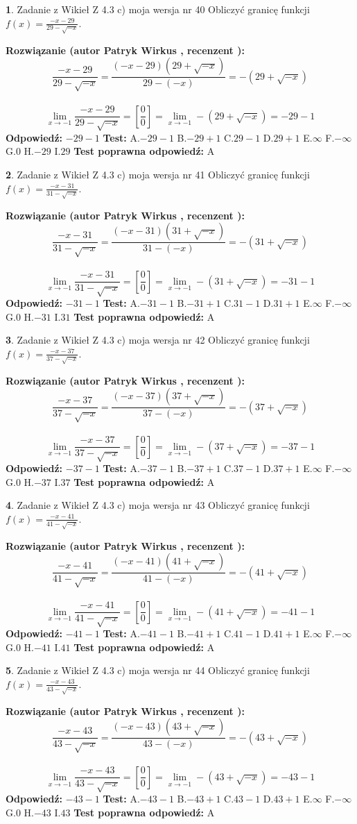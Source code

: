 \documentclass[12pt, a4paper]{article}
\theoremstyle{definition} %
\newtheorem{zad}{}
\newcommand{\zadStart}[1]{\begin{zad}#1\newline}
\newcommand{\zadStop}{\end{zad}}
\newcommand{\rozwStart}[2]{\noindent \textbf{Rozwiązanie (autor #1 , recenzent #2): }\newline}
\newcommand{\rozwStop}{\newline}
\newcommand{\odpStart}{\noindent \textbf{Odpowiedź:}\newline}
\newcommand{\odpStop}{\newline}
\newcommand{\testStart}{\noindent \textbf{Test:}\newline}
\newcommand{\testStop}{\newline}
\newcommand{\kluczStart}{\noindent \textbf{Test poprawna odpowiedź:}\newline}
\newcommand{\kluczStop}{\newline}
\begin{document}
\zadStart{Zadanie z Wikieł Z 4.3 c) moja wersja nr 40}
Obliczyć granicę funkcji $f(x)=\frac{-x-29}{29-\sqrt{-x}}$.
\zadStop
\rozwStart{Patryk Wirkus}{}
$$\frac{-x-29}{29-\sqrt{-x}}=\frac{(-x-29)(29+\sqrt{-x})}{29-(-x)}=-(29+\sqrt{-x})$$
\\
$$\lim\limits_{x\to-1}\frac{-x-29}{29-\sqrt{-x}}=[\frac{0}{0}]=\lim\limits_{x\to-1}-(29+\sqrt{-x}) =-29-1$$
\rozwStop
\odpStart
$-29-1$
\odpStop
\testStart
A.$-29-1$
B.$-29+1$
C.$29-1$
D.$29+1$
E.$\infty$
F.$-\infty$
G.$0$
H.$-29$
I.$29$
\testStop
\kluczStart
A
\kluczStop



\zadStart{Zadanie z Wikieł Z 4.3 c) moja wersja nr 41}
Obliczyć granicę funkcji $f(x)=\frac{-x-31}{31-\sqrt{-x}}$.
\zadStop
\rozwStart{Patryk Wirkus}{}
$$\frac{-x-31}{31-\sqrt{-x}}=\frac{(-x-31)(31+\sqrt{-x})}{31-(-x)}=-(31+\sqrt{-x})$$
\\
$$\lim\limits_{x\to-1}\frac{-x-31}{31-\sqrt{-x}}=[\frac{0}{0}]=\lim\limits_{x\to-1}-(31+\sqrt{-x}) =-31-1$$
\rozwStop
\odpStart
$-31-1$
\odpStop
\testStart
A.$-31-1$
B.$-31+1$
C.$31-1$
D.$31+1$
E.$\infty$
F.$-\infty$
G.$0$
H.$-31$
I.$31$
\testStop
\kluczStart
A
\kluczStop



\zadStart{Zadanie z Wikieł Z 4.3 c) moja wersja nr 42}
Obliczyć granicę funkcji $f(x)=\frac{-x-37}{37-\sqrt{-x}}$.
\zadStop
\rozwStart{Patryk Wirkus}{}
$$\frac{-x-37}{37-\sqrt{-x}}=\frac{(-x-37)(37+\sqrt{-x})}{37-(-x)}=-(37+\sqrt{-x})$$
\\
$$\lim\limits_{x\to-1}\frac{-x-37}{37-\sqrt{-x}}=[\frac{0}{0}]=\lim\limits_{x\to-1}-(37+\sqrt{-x}) =-37-1$$
\rozwStop
\odpStart
$-37-1$
\odpStop
\testStart
A.$-37-1$
B.$-37+1$
C.$37-1$
D.$37+1$
E.$\infty$
F.$-\infty$
G.$0$
H.$-37$
I.$37$
\testStop
\kluczStart
A
\kluczStop



\zadStart{Zadanie z Wikieł Z 4.3 c) moja wersja nr 43}
Obliczyć granicę funkcji $f(x)=\frac{-x-41}{41-\sqrt{-x}}$.
\zadStop
\rozwStart{Patryk Wirkus}{}
$$\frac{-x-41}{41-\sqrt{-x}}=\frac{(-x-41)(41+\sqrt{-x})}{41-(-x)}=-(41+\sqrt{-x})$$
\\
$$\lim\limits_{x\to-1}\frac{-x-41}{41-\sqrt{-x}}=[\frac{0}{0}]=\lim\limits_{x\to-1}-(41+\sqrt{-x}) =-41-1$$
\rozwStop
\odpStart
$-41-1$
\odpStop
\testStart
A.$-41-1$
B.$-41+1$
C.$41-1$
D.$41+1$
E.$\infty$
F.$-\infty$
G.$0$
H.$-41$
I.$41$
\testStop
\kluczStart
A
\kluczStop



\zadStart{Zadanie z Wikieł Z 4.3 c) moja wersja nr 44}
Obliczyć granicę funkcji $f(x)=\frac{-x-43}{43-\sqrt{-x}}$.
\zadStop
\rozwStart{Patryk Wirkus}{}
$$\frac{-x-43}{43-\sqrt{-x}}=\frac{(-x-43)(43+\sqrt{-x})}{43-(-x)}=-(43+\sqrt{-x})$$
\\
$$\lim\limits_{x\to-1}\frac{-x-43}{43-\sqrt{-x}}=[\frac{0}{0}]=\lim\limits_{x\to-1}-(43+\sqrt{-x}) =-43-1$$
\rozwStop
\odpStart
$-43-1$
\odpStop
\testStart
A.$-43-1$
B.$-43+1$
C.$43-1$
D.$43+1$
E.$\infty$
F.$-\infty$
G.$0$
H.$-43$
I.$43$
\testStop
\kluczStart
A
\kluczStop
\end{document}
